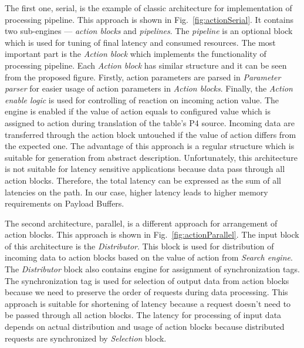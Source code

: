 The first one, serial, is the example of classic architecture for implementation of processing pipeline. This approach is shown
in Fig.~\ref{fig:actionSerial}. It contains two sub-engines --- \textit{action blocks} and \textit{pipelines}. 
The \textit{pipeline} is an optional block which is used for tuning of final latency and consumed resources. 
The most important part is the \textit{Action block} which implements the functionality of processing pipeline. 
Each \textit{Action block} has similar structure and it can be seen from the proposed figure. Firstly, action parameters are parsed in 
\textit{Parameter parser} for easier usage of action parameters in \textit{Action blocks}. 
Finally, the \textit{Action enable logic} is used for controlling of reaction on incoming action value. 
The engine is enabled if the value of action equals to configured value which is assigned to action during translation of the table's P4 source.
Incoming data are transferred through the action block untouched if the value of action differs from the expected one. 
The advantage of this approach is a regular structure which is suitable for generation from abstract description. 
Unfortunately, this architecture is not suitable for latency sensitive applications because data pass through all
action blocks. Therefore, the total latency can be expressed as the sum of all latencies on the path. In our case, 
higher latency leads to higher memory requirements on Payload Buffers.

The second architecture, parallel, is a different approach for arrangement of action blocks. 
This approach is shown in Fig.~\ref{fig:actionParallel}.
The input block of this architecture is the \textit{Distributor}. This block is used for distribution of incoming data to action blocks based on
the value of action from \textit{Search engine}. The \textit{Distributor} block also contains engine for assignment of synchronization tags. 
The synchronization tag is used for selection of output data from action blocks because we need to preserve the order of requests during 
data processing. This approach is suitable for shortening of latency because a request doesn't need to be passed through all action blocks.
The latency for processing of input data depends on actual distribution and usage of action blocks because distributed requests are 
synchronized by \textit{Selection} block. 

